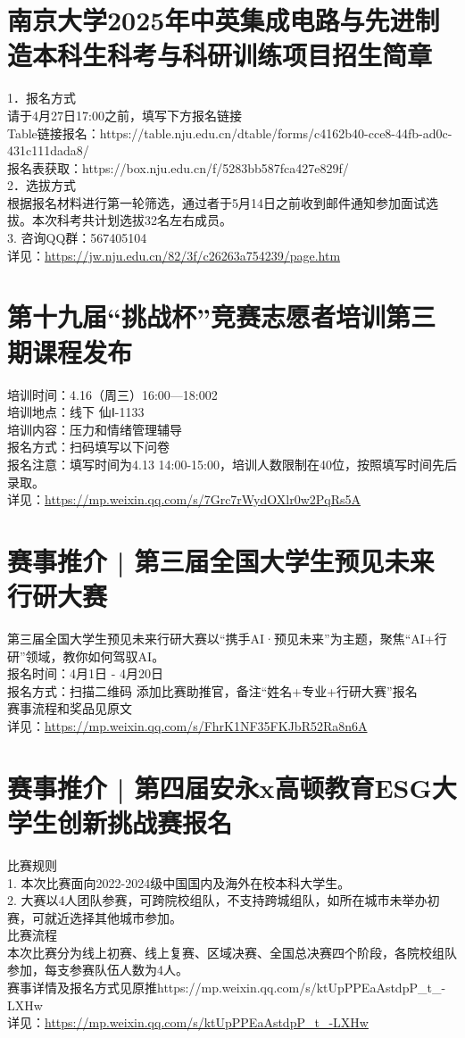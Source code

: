 \documentclass[letterpaper, 12pt]{article}
\begin{document}
\begin{multicols}{2}
\section{南京大学2025年中英集成电路与先进制造本科生科考与科研训练项目招生简章}
1．报名方式
\\请于4月27日17:00之前，填写下方报名链接
\\Table链接报名：https://table.nju.edu.cn/dtable/forms/c4162b40-cce8-44fb-ad0c-431c111dada8/
\\报名表获取：https://box.nju.edu.cn/f/5283bb587fca427e829f/
\\2．选拔方式
\\根据报名材料进行第一轮筛选，通过者于5月14日之前收到邮件通知参加面试选拔。本次科考共计划选拔32名左右成员。
\\3. 咨询QQ群：567405104
\\详见：\url{https://jw.nju.edu.cn/82/3f/c26263a754239/page.htm}

\section{第十九届“挑战杯”竞赛志愿者培训第三期课程发布}
培训时间：4.16（周三）16:00—18:002
\\培训地点：线下 仙Ⅰ-1133
\\培训内容：压力和情绪管理辅导
\\报名方式：扫码填写以下问卷
\\报名注意：填写时间为4.13 14:00-15:00，培训人数限制在40位，按照填写时间先后录取。
\\详见：\url{https://mp.weixin.qq.com/s/7Grc7rWydOXlr0w2PqRs5A}

\section{赛事推介 | 第三届全国大学生预见未来行研大赛}
第三届全国大学生预见未来行研大赛以“携手AI·预见未来”为主题，聚焦“AI+行研”领域，教你如何驾驭AI。
\\报名时间：4月1日 - 4月20日 
\\报名方式：扫描二维码 添加比赛助推官，备注“姓名+专业+行研大赛”报名
\\赛事流程和奖品见原文
\\详见：\url{https://mp.weixin.qq.com/s/FhrK1NF35FKJbR52Ra8n6A}


\section{赛事推介 | 第四届安永x高顿教育ESG大学生创新挑战赛报名}
比赛规则
\\1. 本次比赛面向2022-2024级中国国内及海外在校本科大学生。
\\2. 大赛以4人团队参赛，可跨院校组队，不支持跨城组队，如所在城市未举办初赛，可就近选择其他城市参加。
\\比赛流程
\\本次比赛分为线上初赛、线上复赛、区域决赛、全国总决赛四个阶段，各院校组队参加，每支参赛队伍人数为4人。
\\赛事详情及报名方式见原推https://mp.weixin.qq.com/s/ktUpPPEaAstdpP\_t\_-LXHw
\\详见：\url{https://mp.weixin.qq.com/s/ktUpPPEaAstdpP_t_-LXHw}



\end{multicols}
\end{document}
